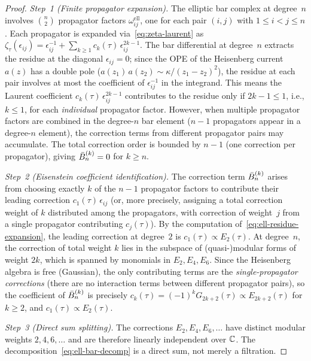 \begin{proof}
\emph{Step~1 (Finite propagator expansion).}
The elliptic bar complex at degree~$n$ involves
$\binom{n}{2}$ propagator factors $\omega_{ij}^{\mathrm{ell}}$,
one for each pair $(i,j)$ with $1 \leq i < j \leq n$.
Each propagator is expanded via~\eqref{eq:zeta-laurent} as
$\zeta_\tau(\epsilon_{ij}) = \epsilon_{ij}^{-1} + \sum_{k \geq 1}
c_k(\tau)\,\epsilon_{ij}^{2k-1}$.  The bar differential at
degree~$n$ extracts the residue at the diagonal
$\epsilon_{ij} = 0$; since the OPE of the Heisenberg current
$a(z)$ has a double pole ($a(z_1)\,a(z_2) \sim
\kappa/(z_1 - z_2)^2$), the residue at each pair involves
at most the coefficient of $\epsilon_{ij}^{-1}$ in the
integrand.  This means the Laurent coefficient $c_k(\tau)\,
\epsilon_{ij}^{2k-1}$ contributes to the residue only if
$2k - 1 \leq 1$, i.e., $k \leq 1$, for each \emph{individual}
propagator factor.  However, when multiple propagator factors
are combined in the degree-$n$ bar element ($n-1$ propagators
appear in a degree-$n$ element), the correction terms from
different propagator pairs may accumulate.  The total correction
order is bounded by $n-1$ (one correction per propagator),
giving $\bar{B}^{(k)}_n = 0$ for $k \geq n$.

\emph{Step~2 (Eisenstein coefficient identification).}
The correction term $\bar{B}^{(k)}_n$ arises from choosing exactly
$k$ of the $n-1$ propagator factors to contribute their leading
correction $c_1(\tau)\,\epsilon_{ij}$ (or, more precisely,
assigning a total correction weight of $k$ distributed
among the propagators, with correction of weight~$j$ from
a single propagator contributing $c_j(\tau)$).
By the computation of~\eqref{eq:ell-residue-expansion}, the
leading correction at degree~$2$ is $c_1(\tau) \propto E_2(\tau)$.
At degree~$n$, the correction of total weight $k$ lies in the
subspace of (quasi-)modular forms of weight $2k$, which is
spanned by monomials in $E_2, E_4, E_6$.  Since the Heisenberg
algebra is free (Gaussian), the only contributing terms are the
\emph{single-propagator corrections} (there are no interaction
terms between different propagator pairs), so the coefficient
of $\bar{B}^{(k)}_n$ is precisely $c_k(\tau) = (-1)^k G_{2k+2}(\tau)
\propto E_{2k+2}(\tau)$ for $k \geq 2$, and $c_1(\tau) \propto
E_2(\tau)$.

\emph{Step~3 (Direct sum splitting).}
The corrections $E_2, E_4, E_6, \ldots$ have distinct modular
weights $2, 4, 6, \ldots$ and are therefore linearly independent
over $\mathbb{C}$.  The decomposition~\eqref{eq:ell-bar-decomp}
is a direct sum, not merely a filtration.
\end{proof}


